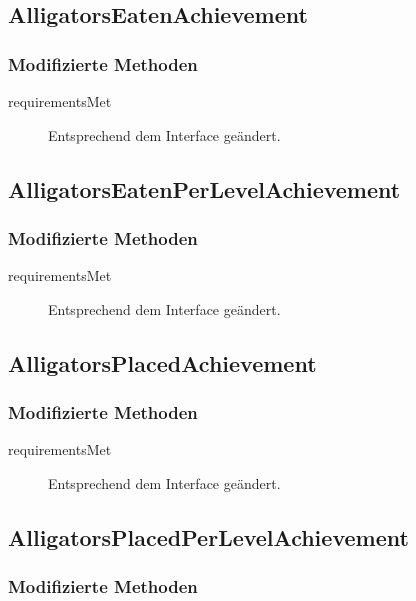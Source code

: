 \subsection{AlligatorsEatenAchievement}

\subsubsection{Modifizierte Methoden}

\begin{description}
	\item[requirementsMet]
	Entsprechend dem Interface geändert.
\end{description}

\subsection{AlligatorsEatenPerLevelAchievement}

\subsubsection{Modifizierte Methoden}

\begin{description}
	\item[requirementsMet]
	Entsprechend dem Interface geändert.
\end{description}

\subsection{AlligatorsPlacedAchievement}

\subsubsection{Modifizierte Methoden}

\begin{description}
	\item[requirementsMet]
	Entsprechend dem Interface geändert.
\end{description}

\subsection{AlligatorsPlacedPerLevelAchievement}

\subsubsection{Modifizierte Methoden}

